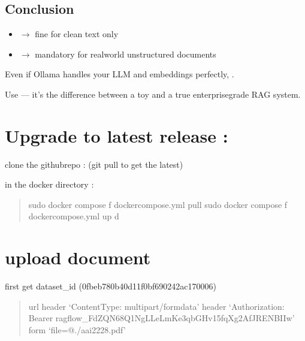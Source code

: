 \documentclass[letterpaper,10pt,english]{sphinxmanual}
\begin{document}
\section{Conclusion}
\label{\detokenize{ragflow-gpu-cpu:conclusion}}\begin{itemize}
\item {} 
\sphinxAtStartPar
{}  \(\rightarrow\) fine for clean text only

\item {} 
\sphinxAtStartPar
{}  \(\rightarrow\) mandatory for real\sphinxhyphen{}world unstructured documents

\end{itemize}

\sphinxAtStartPar
Even if Ollama handles your LLM and embeddings perfectly, .

\sphinxAtStartPar
Use  — it’s the difference between a toy and a true enterprise\sphinxhyphen{}grade RAG system.

\sphinxstepscope


\chapter{Upgrade to latest release :}
\label{\detokenize{upgrade:upgrade-to-latest-release}}\label{\detokenize{upgrade::doc}}
\sphinxAtStartPar
clone the github\sphinxhyphen{}repo : 
(git pull to get the latest)

\sphinxAtStartPar
in the docker directory :
\begin{quote}

\sphinxAtStartPar
sudo docker compose \sphinxhyphen{}f docker\sphinxhyphen{}compose.yml pull
sudo docker compose \sphinxhyphen{}f docker\sphinxhyphen{}compose.yml up \sphinxhyphen{}d
\end{quote}

\sphinxstepscope


\chapter{upload document}
\label{\detokenize{upload-document:upload-document}}\label{\detokenize{upload-document::doc}}
\sphinxAtStartPar
first get dataset\_id (0fbeb780b40d11f0bf690242ac170006)
\begin{quote}
\begin{description}
\sphinxAtStartPar
\textendash{}url  \textendash{}header ‘Content\sphinxhyphen{}Type: multipart/form\sphinxhyphen{}data’ \textendash{}header ‘Authorization: Bearer ragflow\sphinxhyphen{}\_FdZQN68Q1NgLLeLmKe\sphinxhyphen{}3qbGHv15fqXg2AfJRENBIIw’ \textendash{}form ‘file=@./aai2228.pdf’

\end{description}
\end{quote}
\end{document}
